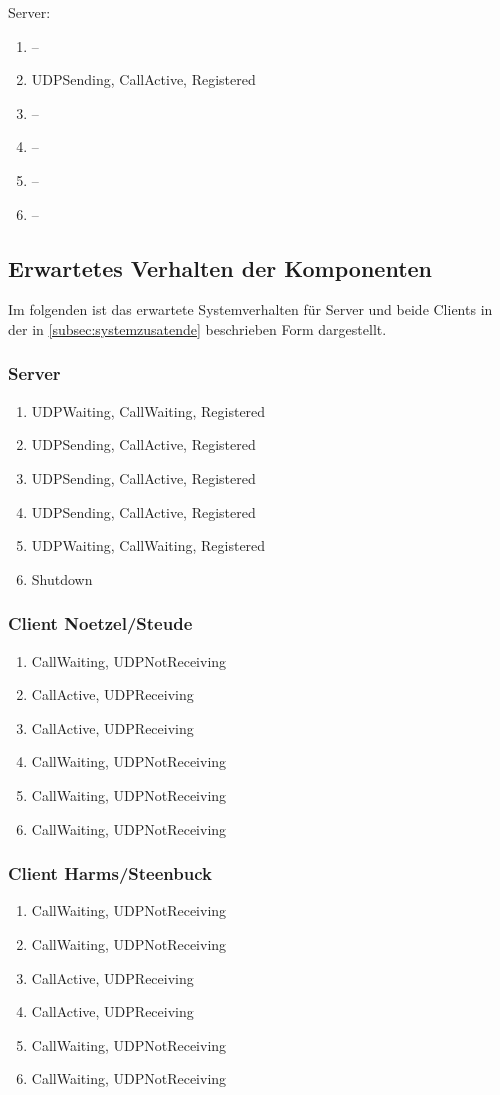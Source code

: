 \documentclass[10pt]{scrartcl}
\begin{document}
Server:
\begin{enumerate}
	\item --
	\item UDPSending, CallActive, Registered
	\item --
	\item --
	\item --
	\item --
\end{enumerate}

\subsection{Erwartetes Verhalten der Komponenten}\label{subsec:erwartetesSystemverhalten}
Im folgenden ist das erwartete Systemverhalten für Server und beide Clients in der in \ref{subsec:systemzusatende} beschrieben Form dargestellt.

\subsubsection{Server}
\begin{enumerate}
	\item UDPWaiting, CallWaiting, Registered
	\item UDPSending, CallActive, Registered
	\item UDPSending, CallActive, Registered
	\item UDPSending, CallActive, Registered
	\item UDPWaiting, CallWaiting, Registered
	\item Shutdown
\end{enumerate}

\subsubsection{Client Noetzel/Steude}
\begin{enumerate}
	\item CallWaiting, UDPNotReceiving
	\item CallActive, UDPReceiving
	\item CallActive, UDPReceiving
	\item CallWaiting, UDPNotReceiving
	\item CallWaiting, UDPNotReceiving
	\item CallWaiting, UDPNotReceiving
\end{enumerate}

\subsubsection{Client Harms/Steenbuck}
\begin{enumerate}
	\item CallWaiting, UDPNotReceiving
	\item CallWaiting, UDPNotReceiving
	\item CallActive, UDPReceiving
	\item CallActive, UDPReceiving
	\item CallWaiting, UDPNotReceiving
	\item CallWaiting, UDPNotReceiving
\end{enumerate}
\end{document}
